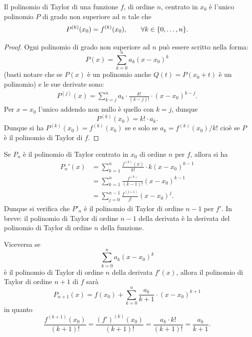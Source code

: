\begin{theorem}%
\label{th:caratterizzazioneTaylor}%
\mymark{***}%
Il polinomio di Taylor di una funzione $f$, di ordine $n$, centrato in $x_0$ è l'unico polinomio $P$ di grado non superiore ad $n$ tale che
\[
  P^{(k)}(x_0) = f^{(k)}(x_0), \qquad \forall k \in {\left\{ 0,\dots,n \right\}}.
\]
\end{theorem}
%
\begin{proof}

Ogni polinomio di grado non superiore ad $n$ può essere scritto nella forma:
\[
  P(x) = \sum_{k=0}^{n} a_k (x-x_0)^k
\]
(basti notare che se $P(x)$ è un polinomio anche $Q(t) = P(x_0+t)$ è
un polinomio)
e le sue derivate sono:
\begin{align*}
   P^{(j)}(x)
   = \sum_{k=j}^n a_k \cdot \frac{k!}{(k-j)!}\cdot (x-x_0)^{k-j}.
\end{align*}
Per $x=x_0$ l'unico addendo non nullo è quello con $k=j$, dunque
\[
  P^{(k)}(x_0) = k! \cdot a_k.
\]
Dunque si ha $P^{(k)}(x_0) = f^{(k)}(x_0)$ se e solo se $a_k = f^{(k)}(x_0)/k!$ 
cioè se $P$ è il polinomio di Taylor di $f$.
\end{proof}

\begin{remark}
Se $P_n$ è il polinomio di Taylor centrato in $x_0$ di ordine $n$ per $f$, allora
si ha
\begin{align*}
P_n'(x) &= \sum_{k=1}^{n} \frac{f^{(k)}(x)}{k!}\cdot k(x-x_0)^{k-1} \\
  &= \sum_{k=1}^{n} \frac{f^{(k)}}{(k-1)!} (x-x_0)^{k-1} \\
  &= \sum_{j=0}^{n-1} \frac{f^{(j+1)}}{j!} (x-x_0)^j.
\end{align*}
Dunque si verifica che $P'_n$ è il polinomio di Taylor di ordine $n-1$ per $f'$.
In breve: il polinomio di Taylor di ordine $n-1$ della derivata è la derivata
del polinomio di Taylor di ordine $n$ della funzione.

Viceversa se
\[
   \sum_{k=0}^n a_k (x-x_0)^k
\]
è il polinomio di Taylor di ordine $n$ della derivata $f'(x)$, allora
il polinomio di Taylor di ordine $n+1$ di $f$ sarà%
\begin{equation}\label{eq:4993725}
  P_{n+1}(x) = f(x_0) + \sum_{k=0}^{n} \frac{a_{k}}{k+1}\cdot (x-x_0)^{k+1}
\end{equation}
in quanto
\[
  \frac{f^{(k+1)}(x_0)}{(k+1)!}
  =\frac{(f')^{(k)}(x_0)}{(k+1)!}
  = \frac{a_k \cdot k!}{ (k+1)!}
  = \frac{a_k}{k+1}.
\]
\end{remark}

